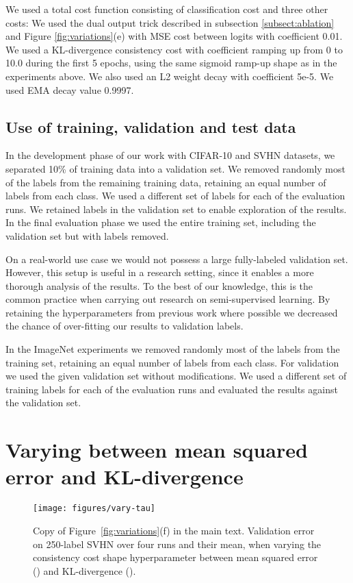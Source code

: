 \documentclass{article}
\begin{document}
We used a total cost function consisting of classification cost and three other costs:
We used the dual output trick described in subsection \ref{subsect:ablation} and Figure \ref{fig:variations}(e) with MSE cost between logits with coefficient 0.01.
We used a KL-divergence consistency cost with coefficient ramping up from 0 to 10.0 during the first 5 epochs, using the same sigmoid ramp-up shape as in the experiments above.
We also used an L2 weight decay with coefficient 5e-5.
We used EMA decay value 0.9997.

\subsection{Use of training, validation and test data}

In the development phase of our work with CIFAR-10 and SVHN datasets, we separated 10\% of training data into a validation set.
We removed randomly most of the labels from the remaining training data, retaining an equal number of labels from each class.
We used a different set of labels for each of the evaluation runs.
We retained labels in the validation set to enable exploration of the results.
In the final evaluation phase we used the entire training set, including the validation set but with labels removed.

On a real-world use case we would not possess a large fully-labeled validation set.
However, this setup is useful in a research setting, since it enables a more thorough analysis of the results.
To the best of our knowledge, this is the common practice when carrying out research on semi-supervised learning.
By retaining the hyperparameters from previous work where possible we decreased the chance of over-fitting our results to validation labels.

In the ImageNet experiments we removed randomly most of the labels from the training set, retaining an equal number of labels from each class.
For validation we used the given validation set without modifications.
We used a different set of training labels for each of the evaluation runs and evaluated the results against the validation set.


\section{Varying between mean squared error and KL-divergence}
\label{appendix:math}

\begin{figure}[t]
\centering
\texttt{[image: figures/vary-tau]}
\caption{
\label{fig:tau-variation}
Copy of Figure~\ref{fig:variations}(f) in the main text.
Validation error on 250-label SVHN over four runs and their mean, when varying the consistency cost shape hyperparameter  between mean squared error () and KL-divergence ().
}
\end{figure}
\end{document}
